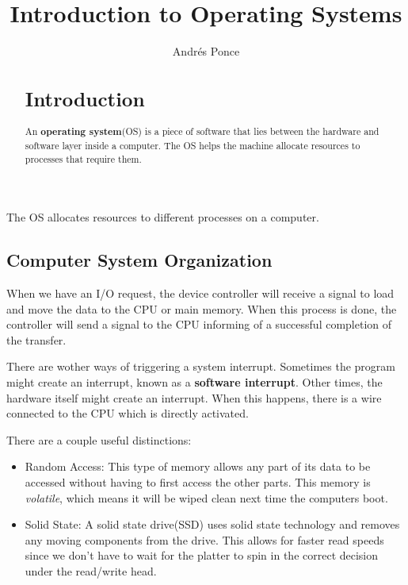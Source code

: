 \documentclass{tufte-handout}
\title{Introduction to Operating Systems}
\author{Andr\'es Ponce}
\begin{document}
\maketitle
\begin{abstract}

\section{Introduction}
An \textbf{operating system}(OS) is a piece of software that lies between the
hardware and software layer inside a computer. 
The OS helps the machine allocate resources to processes that require them.
\end{abstract}

The OS allocates resources to different processes on a computer. 
\subsection{Computer System Organization}
When we have an I/O request, the device controller will receive a signal to load 
and move the data to the CPU or main memory. When this process is done, the controller
will send a signal to the CPU informing of a successful completion of the transfer.

There are wother ways of triggering a system interrupt. Sometimes the program might
create an interrupt, known as a \textbf{software interrupt}. Other times, the 
hardware itself might create an interrupt. When this happens, there is a wire
connected to the CPU which is directly activated.

There are a couple useful distinctions:
\begin{itemize}
	\item Random Access: This type of memory allows any part of its data to be accessed
			without having to first access the other parts. This memory is 
			\textit{volatile}, which means it will be wiped clean next time the computers
			boot.
	\item Solid State: A solid state drive(SSD) uses solid state technology and removes
			any moving components from the drive. This allows for faster read speeds since
			we don't have to wait for the platter to spin in the correct decision 
			under the read/write head.
\end{itemize}
\end{document}
